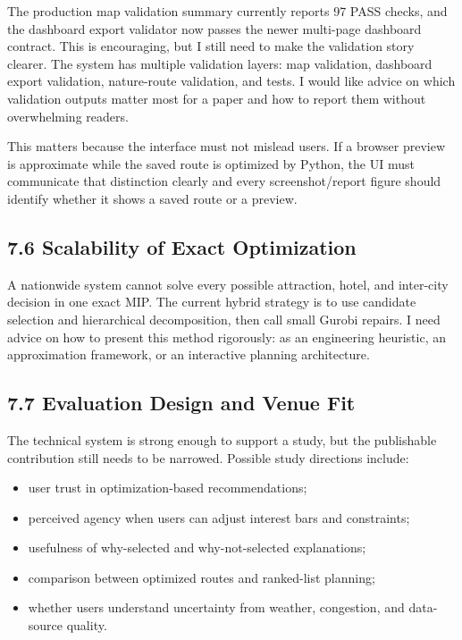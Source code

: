 \documentclass[11pt,a4paper]{article}
\begin{document}
\noindent The production map validation summary currently reports 97 PASS checks, and the dashboard export validator now passes the newer multi-page dashboard contract. This is encouraging, but I still need to make the validation story clearer. The system has multiple validation layers: map validation, dashboard export validation, nature-route validation, and tests. I would like advice on which validation outputs matter most for a paper and how to report them without overwhelming readers.

\vspace{0.5em}
\noindent This matters because the interface must not mislead users. If a browser preview is approximate while the saved route is optimized by Python, the UI must communicate that distinction clearly and every screenshot/report figure should identify whether it shows a saved route or a preview.

\subsection*{7.6 Scalability of Exact Optimization}

\noindent A nationwide system cannot solve every possible attraction, hotel, and inter-city decision in one exact MIP. The current hybrid strategy is to use candidate selection and hierarchical decomposition, then call small Gurobi repairs. I need advice on how to present this method rigorously: as an engineering heuristic, an approximation framework, or an interactive planning architecture.

\subsection*{7.7 Evaluation Design and Venue Fit}

\noindent The technical system is strong enough to support a study, but the publishable contribution still needs to be narrowed. Possible study directions include:

\begin{itemize}
    \item user trust in optimization-based recommendations;
    \item perceived agency when users can adjust interest bars and constraints;
    \item usefulness of why-selected and why-not-selected explanations;
    \item comparison between optimized routes and ranked-list planning;
    \item whether users understand uncertainty from weather, congestion, and data-source quality.
\end{itemize}
\end{document}
